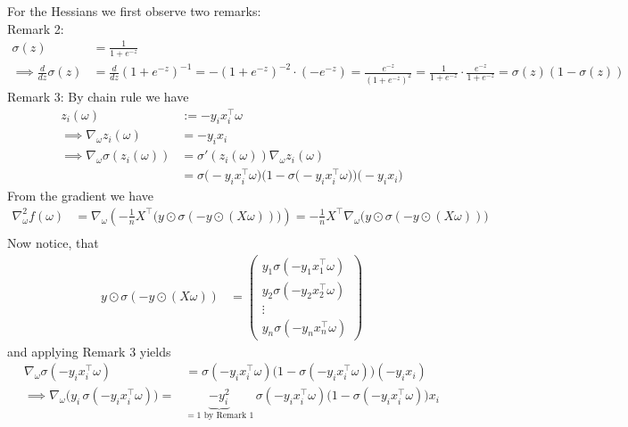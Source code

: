 \documentclass{article}
\begin{document}
For the Hessians we first observe two remarks:\\
Remark 2:
\begin{align*}
  \sigma(z) &= \frac{1}{1 + e^{-z}} \\
  \implies \frac{d}{dz} \sigma(z) &= \frac{d}{dz} (1 + e^{-z})^{-1}
  = -(1 + e^{-z})^{-2} \cdot (-e^{-z}) = \frac{e^{-z}}{(1 + e^{-z})^2}
  = \frac{1}{1 + e^{-z}} \cdot \frac{e^{-z}}{1 + e^{-z}}
  = \sigma(z) (1 - \sigma(z))
\end{align*}
Remark 3: By chain rule we have
\begin{align*}
z_i(\omega) &:= -y_i x_i^\top \omega \\
\implies \nabla_\omega z_i(\omega) &= -y_i x_i \\
\implies \nabla_\omega \sigma(z_i(\omega)) 
&= \sigma'(z_i(\omega)) \nabla_\omega z_i(\omega) \\
&= \sigma\bigl(-y_i x_i^\top \omega\bigr)\bigl(1 - \sigma\bigl(-y_i x_i^\top \omega\bigr)\bigr)\bigl(-y_i x_i\bigr)
\end{align*}
%
From the gradient we have
\begin{align*}
\nabla^2_\omega f(\omega) 
&= \nabla_\omega \left( -\frac{1}{n} X^\top \big(y \odot \sigma(-y \odot (X\omega))\big) \right) = -\frac{1}{n} X^\top \nabla_\omega \big(y \odot \sigma(-y \odot (X\omega))\big) \\
%
\end{align*}
Now notice, that
\begin{align*}
y \odot \sigma(-y \odot (X\omega)) &= \begin{pmatrix}
y_1 \sigma(-y_1 x_1^\top \omega) \\
y_2 \sigma(-y_2 x_2^\top \omega) \\
\vdots \\
y_n \sigma(-y_n x_n^\top \omega)
\end{pmatrix}
\end{align*}
and applying Remark 3 yields 
\begin{align*}
\nabla_\omega \sigma(-y_i x_i^\top \omega) 
&= \sigma(-y_i x_i^\top \omega)\big(1 - \sigma(-y_i x_i^\top \omega)\big)(-y_i x_i) \\
%
\implies \nabla_\omega \big(y_i \, \sigma(-y_i x_i^\top \omega)\big) 
=& \underbrace{ -y_i^2}_{=1 \text{ by Remark 1}} \, \sigma(-y_i x_i^\top \omega)\big(1 - \sigma(-y_i x_i^\top \omega)\big) x_i \\
%
\end{align*}
\end{document}
